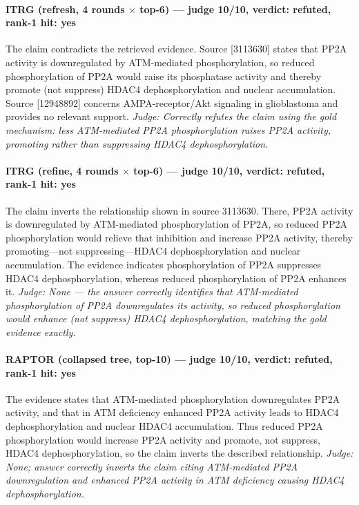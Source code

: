 \documentclass[sigconf, review, anonymous]{acmart}
\begin{document}
\paragraph{ITRG (refresh, 4 rounds $\times$ top-6) --- judge 10/10, verdict: refuted, rank-1 hit: yes}
\noindent The claim contradicts the retrieved evidence. Source [3113630] states that PP2A activity is downregulated by ATM-mediated phosphorylation, so reduced phosphorylation of PP2A would raise its phosphatase activity and thereby promote (not suppress) HDAC4 dephosphorylation and nuclear accumulation. Source [12948892] concerns AMPA-receptor/Akt signaling in glioblastoma and provides no relevant support.
\noindent\small\textit{Judge: Correctly refutes the claim using the gold mechanism: less ATM-mediated PP2A phosphorylation raises PP2A activity, promoting rather than suppressing HDAC4 dephosphorylation.}
\paragraph{ITRG (refine, 4 rounds $\times$ top-6) --- judge 10/10, verdict: refuted, rank-1 hit: yes}
\noindent The claim inverts the relationship shown in source 3113630. There, PP2A activity is downregulated by ATM-mediated phosphorylation of PP2A, so reduced PP2A phosphorylation would relieve that inhibition and increase PP2A activity, thereby promoting---not suppressing---HDAC4 dephosphorylation and nuclear accumulation. The evidence indicates phosphorylation of PP2A suppresses HDAC4 dephosphorylation, whereas reduced phosphorylation of PP2A enhances it.
\noindent\small\textit{Judge: None --- the answer correctly identifies that ATM-mediated phosphorylation of PP2A downregulates its activity, so reduced phosphorylation would enhance (not suppress) HDAC4 dephosphorylation, matching the gold evidence exactly.}
\paragraph{RAPTOR (collapsed tree, top-10) --- judge 10/10, verdict: refuted, rank-1 hit: yes}
\noindent The evidence states that ATM-mediated phosphorylation downregulates PP2A activity, and that in ATM deficiency enhanced PP2A activity leads to HDAC4 dephosphorylation and nuclear HDAC4 accumulation. Thus reduced PP2A phosphorylation would increase PP2A activity and promote, not suppress, HDAC4 dephosphorylation, so the claim inverts the described relationship.
\noindent\small\textit{Judge: None; answer correctly inverts the claim citing ATM-mediated PP2A downregulation and enhanced PP2A activity in ATM deficiency causing HDAC4 dephosphorylation.}
\end{document}
